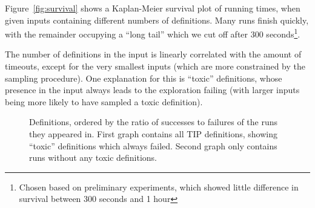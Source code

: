 Figure~\ref{fig:survival} shows a Kaplan-Meier survival plot of \qspec{} running
times, when given inputs containing different numbers of definitions. Many runs
finish quickly, with the remainder occupying a ``long tail'' which we cut off
after 300 seconds\footnote{Chosen based on preliminary experiments, which showed
  little difference in survival between 300 seconds and 1 hour}.

The number of definitions in the input is linearly correlated with the amount of
timeouts, except for the very smallest inputs (which are more constrained by the
sampling procedure). One explanation for this is ``toxic'' definitions, whose
presence in the input always leads to the exploration failing (with larger
inputs being more likely to have sampled a toxic definition).

\iffalse
\begin{figure}
  \scalebox{0.45}{}
  \scalebox{0.45}{}
  \caption{Proportion of samples which timed out per size, with least-squares
    linear regression. First plot is for all TIP definitions, second removes
    runs given ``toxic'' definitions.}
  \label{fig:tailsize}
\end{figure}
\fi

\begin{figure}
  \scalebox{0.45}{}
  \scalebox{0.45}{}
  \label{fig:proportions}
  \caption{Definitions, ordered by the ratio of successes to failures of the
    runs they appeared in. First graph contains all TIP definitions, showing
    ``toxic'' definitions which always failed. Second graph only contains runs
    without any toxic definitions.}
\end{figure}

